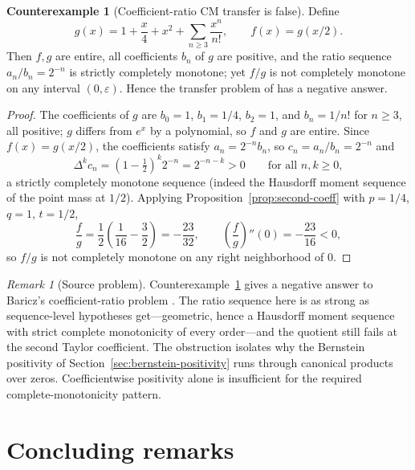 \documentclass[preprint,12pt]{elsarticle}
\theoremstyle{plain}
\theoremstyle{definition}
\newtheorem{counterexample}[theorem]{Counterexample}
\theoremstyle{remark}
\newtheorem{remark}[theorem]{Remark}
\newcommand{\CM}{\mathrm{CM}}
\begin{document}
\begin{counterexample}[Coefficient-ratio \(\CM\) transfer is false]
\label{cx:transfer}
Define
\begin{equation}
g(x)=1+\frac x4+x^2+\sum_{n\ge3}\frac{x^n}{n!},
\qquad
f(x)=g(x/2).
\end{equation}
Then \(f,g\) are entire, all coefficients \(b_n\) of \(g\) are positive, and
the ratio sequence \(a_n/b_n=2^{-n}\) is strictly completely monotone; yet
\(f/g\) is not completely monotone on any interval \((0,\varepsilon)\). Hence
the transfer problem of \cite{baricz-bounds} has a negative answer.
\end{counterexample}
\begin{proof}
The coefficients of \(g\) are \(b_0=1\), \(b_1=1/4\), \(b_2=1\), and
\(b_n=1/n!\) for \(n\ge3\), all positive; \(g\) differs from \(e^x\) by a
polynomial, so \(f\) and \(g\) are entire. Since \(f(x)=g(x/2)\), the
coefficients satisfy \(a_n=2^{-n}b_n\), so \(c_n=a_n/b_n=2^{-n}\) and
\begin{equation}
\Delta^kc_n=\left(1-\tfrac12\right)^k2^{-n}=2^{-n-k}>0
\qquad\text{for all }n,k\ge0,
\end{equation}
a strictly completely monotone sequence (indeed the Hausdorff moment
sequence \cite{hausdorff} of the point mass at \(1/2\)). Applying
Proposition~\ref{prop:second-coeff} with \(p=1/4\), \(q=1\), \(t=1/2\),
\begin{equation}
[x^2]\frac fg=\frac12\left(\frac1{16}-\frac32\right)=-\frac{23}{32},
\qquad
\left(\frac fg\right)''(0)=-\frac{23}{16}<0,
\end{equation}
so \(f/g\) is not completely monotone on any right neighborhood of \(0\).
\end{proof}

\begin{remark}[Source problem]
Counterexample~\ref{cx:transfer} gives a negative answer to Baricz's
coefficient-ratio problem \cite[Problem~4.3(c)]{baricz-bounds}. The ratio sequence here is
as strong as sequence-level hypotheses get---geometric, hence a Hausdorff
moment sequence with strict complete monotonicity of every order---and the
quotient still fails at the second Taylor coefficient. The obstruction
isolates why the Bernstein positivity of
Section~\ref{sec:bernstein-positivity} runs through canonical products over
zeros. Coefficientwise positivity alone is insufficient for the required
complete-monotonicity pattern.
\end{remark}

\section{Concluding remarks}
\end{document}

